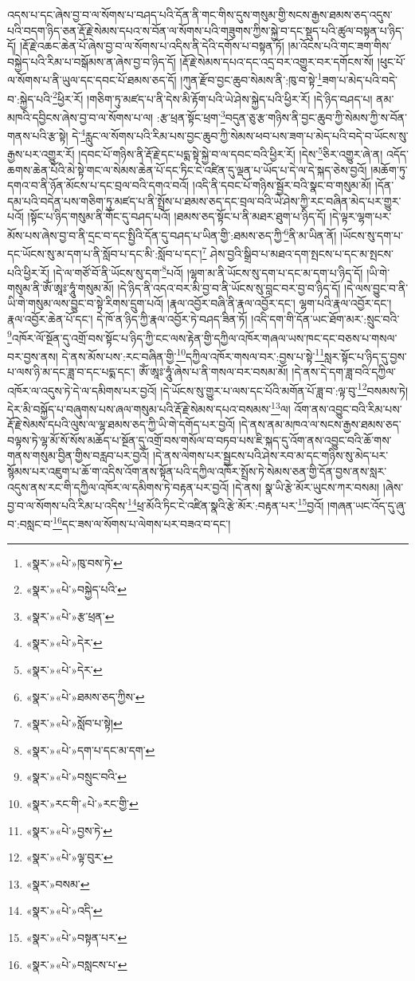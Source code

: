 འདས་པ་དང་ཞེས་བྱ་བ་ལ་སོགས་པ་བཤད་པའི་དོན་ནི་གང་གིས་དུས་གསུམ་གྱི་སངས་རྒྱས་ཐམས་ཅད་འདུས་པའི་བདག་ཉིད་ཅན་རྡོ་རྗེ་སེམས་དཔའ་ས་བོན་ལ་སོགས་པའི་གཟུགས་ཀྱིས་སྐྱེ་བ་དང་སྡུད་པའི་ཚུལ་བསྟན་པ་ཉིད་དོ། །རྡོ་རྗེ་འཆང་ཆེན་པོ་ཞེས་བྱ་བ་ལ་སོགས་པ་འདིས་ནི་དེའི་དགོས་པ་བསྟན་ཏོ། །མ་འོངས་པའི་གང་ཟག་གིས་བསྐྱེད་པའི་རིམ་པ་བསྒོམས་ན་ཞེས་བྱ་བ་ཉིད་དོ། །རྡོ་རྗེ་སེམས་དཔའ་དང་འདྲ་བར་འགྱུར་བར་དགོངས་སོ། །ཕུང་པོ་ལ་སོགས་པ་ནི་ཡུལ་དང་དབང་པོ་ཐམས་ཅད་དོ། །ཀུན་རྫོབ་བྱང་ཆུབ་སེམས་ནི་:ཁུ་བ་སྟེ་\footnote{«སྣར་»«པེ་»ཁུ་བས་ཏེ་}ཟག་པ་མེད་པའི་བདེ་བ་:སྐྱེད་པའི་\footnote{«སྣར་»«པེ་»བསྐྱེད་པའི་}ཕྱིར་རོ། །གཅིག་ཏུ་མཛད་པ་ནི་དེས་མི་རྟོག་པའི་ཡེ་ཤེས་སྐྱེད་པའི་ཕྱིར་རོ། །དེ་ཉིད་བཤད་པ། ནམ་མཁའི་དབྱིངས་ཞེས་བྱ་བ་ལ་སོགས་པ་ལ། :རྩ་ཕྲན་སྟོང་ཕྲག་\footnote{«སྣར་»«པེ་»རྩ་ཕྲན་}བདུན་ཅུ་རྩ་གཉིས་ནི་བྱང་ཆུབ་ཀྱི་སེམས་ཀྱི་ས་བོན་གནས་པའི་རྩ་སྟེ། དེ་\footnote{«སྣར་»«པེ་»དེར་}རླུང་ལ་སོགས་པའི་རིམ་པས་བྱང་ཆུབ་ཀྱི་སེམས་ཕབ་པས་ཟག་པ་མེད་པའི་བདེ་བ་ཡོངས་སུ་རྒྱས་པར་འགྱུར་རོ། །དབང་པོ་གཉིས་ནི་རྡོ་རྗེ་དང་པདྨ་སྟེ་སྐྱེ་བ་ལ་དབང་བའི་ཕྱིར་རོ། །དེས་\footnote{«སྣར་»«པེ་»དེར་}ཅིར་འགྱུར་ཞེ་ན། འདོད་ཆགས་ཆེན་པོའི་མེ་སྟེ་གང་ལ་སེམས་ཆེན་པོ་དང་ཏིང་ངེ་འཛིན་དུ་ལྡན་པ་ཡོད་པ་དེ་ལ་དེ་སྐད་ཅེས་བྱའོ། །མཆོག་ཏུ་དགའ་བ་ནི་ཉོན་མོངས་པ་དང་བྲལ་བའི་དགའ་བའོ། །འདི་ནི་དབང་པོ་གཉིས་སྦྱོར་བའི་སྣང་བ་གསུམ་མོ། །དོན་དམ་པའི་བདེན་པས་གཅིག་ཏུ་མཛད་པ་ནི་སྤྲོས་པ་ཐམས་ཅད་དང་བྲལ་བའི་ཡེ་ཤེས་ཀྱི་རང་བཞིན་མེད་པར་གྱུར་པའོ། །སྟོང་པ་ཉིད་གསུམ་ནི་གོང་དུ་བཤད་པའོ། །ཐམས་ཅད་སྟོང་པ་ནི་མཐར་ཐུག་པ་ཉིད་དོ། །དེ་ལྟར་ལྷག་པར་མོས་པས་ཞེས་བྱ་བ་ནི་དྲང་བ་དང་སྤྱིའི་དོན་དུ་བཤད་པ་ཡིན་གྱི་:ཐམས་ཅད་ཀྱི་\footnote{«སྣར་»«པེ་»ཐམས་ཅད་ཀྱིས་}ནི་མ་ཡིན་ནོ། །ཡོངས་སུ་དག་པ་དང་ཡོངས་སུ་མ་དག་པ་ནི་སློབ་པ་དང་མི་:སློབ་པ་དང་།\footnote{«སྣར་»«པེ་»སློབ་པ་སྟེ།} ཤེས་བྱའི་སྒྲིབ་པ་མཐའ་དག་སྤངས་པ་དང་མ་སྤངས་པའི་ཕྱིར་རོ། །དེ་ལ་གཙོ་བོ་ནི་ཡོངས་སུ་དག་\footnote{«སྣར་»«པེ་»དག་པ་དང་མ་དག་}པའོ། །ལྷག་མ་ནི་ཡོངས་སུ་དག་པ་དང་མ་དག་པ་ཉིད་དོ། །ཡི་གེ་གསུམ་ནི་ཨོཾ་ཨཱཿ་ཧཱུཾ་གསུམ་མོ། །དེ་ཉིད་ནི་འདའ་བར་མི་བྱ་བ་ནི་ཡོངས་སུ་བླང་བར་བྱ་བ་ཉིད་དོ། །དེ་ལས་བྱུང་བ་ནི་ཡི་གེ་གསུམ་ལས་བྱུང་བ་སྟེ་རིགས་དྲུག་པའོ། །རྣལ་འབྱོར་བཞི་ནི་རྣལ་འབྱོར་དང་། ལྷག་པའི་རྣལ་འབྱོར་དང་། རྣལ་འབྱོར་ཆེན་པོ་དང་། དེ་ཁོ་ན་ཉིད་ཀྱི་རྣལ་འབྱོར་ཏེ་བཤད་ཟིན་ཏོ། །འདི་དག་གི་དོན་ཡང་ཐོག་མར་:སྲུང་བའི་\footnote{«སྣར་»«པེ་»བསྲུང་བའི་}འཁོར་ལོ་སྔོན་དུ་འགྲོ་བས་སྟོང་པ་ཉིད་ཀྱི་ངང་ལས་རྟེན་གྱི་དཀྱིལ་འཁོར་གཞལ་ཡས་ཁང་དང་བཅས་པ་གསལ་བར་བྱས་ནས། དེ་ནས་མོས་པས་:རང་བཞིན་གྱི་\footnote{«སྣར་»རང་གི་«པེ་»རང་གྱི་}དཀྱིལ་འཁོར་གསལ་བར་:བྱས་པ་སྟེ་\footnote{«སྣར་»«པེ་»བྱས་ཏེ་}སླར་སྟོང་པ་ཉིད་དུ་བྱས་པ་ལས་ཉི་མ་དང་ཟླ་བ་དང་པདྨ་དང་། ཨོཾ་ཨཱཿ་ཧཱུཾ་ཞེས་པ་ནི་གསལ་བར་བསམ་མོ། །དེ་ནས་དེ་དག་ཟླ་བའི་དཀྱིལ་འཁོར་ལ་འདུས་ཏེ་དེ་ལ་དམིགས་པར་བྱའོ། །དེ་ཡོངས་སུ་གྱུར་པ་ལས་དང་པོའི་མགོན་པོ་ཟླ་བ་:ལྟ་བུ་\footnote{«སྣར་»«པེ་»ལྟ་བུར་}བསམས་ཏེ། དེར་མི་བསྐྱོད་པ་བཞུགས་པས་ཞལ་གསུམ་པའི་རྡོ་རྗེ་སེམས་དཔའ་བསམས་\footnote{«སྣར་»བསམ་}ལ། འོག་ནས་འབྱུང་བའི་རིམ་པས་རྡོ་རྗེ་སེམས་དཔའི་ལུས་ལ་ལྷ་ཐམས་ཅད་ཀྱི་ཡི་གེ་དགོད་པར་བྱའོ། །དེ་ནས་ནམ་མཁའ་ལ་སངས་རྒྱས་ཐམས་ཅད་བལྟས་ཏེ་ལྷ་མོ་སོ་སོས་མཆོད་པ་སྔོན་དུ་འགྲོ་བས་གསོལ་བ་བཏབ་པས་ཇི་སྐད་དུ་འོག་ནས་འབྱུང་བའི་ཆོ་གས་གནས་གསུམ་བྱིན་གྱིས་བརླབ་པར་བྱའོ། །དེ་ནས་ལེགས་པར་སྦྱངས་པའི་ཤེས་རབ་མ་དང་གཉིས་སུ་མེད་པར་སྙོམས་པར་འཇུག་པ་ཆོ་ག་འདིས་འོག་ནས་སྟོན་པའི་དཀྱིལ་འཁོར་སྤྲོས་ཏེ་སེམས་ཅན་གྱི་དོན་བྱས་ནས་སླར་འདུས་ནས་རང་གི་དཀྱིལ་འཁོར་ལ་དམིགས་ཏེ་བརྟན་པར་བྱའོ། །དེ་ནས། སྣ་ཡི་རྩེ་མོར་ཡུངས་ཀར་བསམ། །ཞེས་བྱ་བ་ལ་སོགས་པའི་རིམ་པ་འདིས་\footnote{«སྣར་»«པེ་»འདི་}ཕྲ་མོའི་ཏིང་ངེ་འཛིན་སྣའི་རྩེ་མོར་:བརྟན་པར་\footnote{«སྣར་»«པེ་»བསྟན་པར་}བྱའོ། །གཞན་ཡང་འོད་དུ་ཞུ་བ་:བསླང་བ་\footnote{«སྣར་»«པེ་»བསླངས་པ་}དང་ཟས་ལ་སོགས་པ་ལེགས་པར་བཟའ་བ་དང་། 